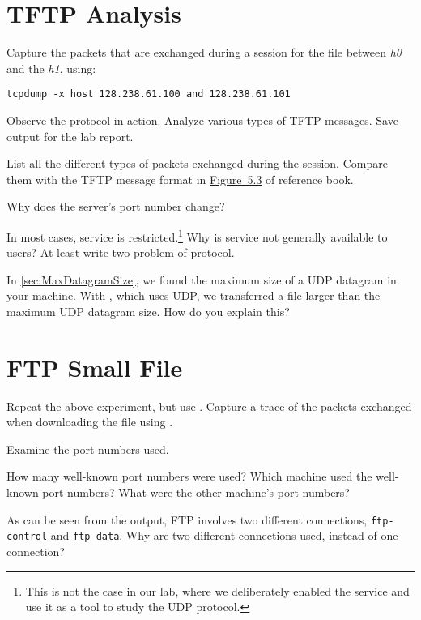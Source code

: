 \documentclass{../UTNetLab}
\begin{document}
\section{TFTP Analysis}
Capture the packets that are exchanged during a  session for the  file between \textit{h0} and the \textit{h1}, using:
\begin{lstlisting}[emph={h0,h1,netlab},morekeywords={[3]host,and}]
tcpdump -x host 128.238.61.100 and 128.238.61.101
    \end{lstlisting}
Observe the protocol in action.
Analyze various types of TFTP messages.
Save  output for the lab report.

\begin{report}
    \item List all the different types of packets exchanged during the  session.
    Compare them with the TFTP message format in \hyperref[fig:5.3]{Figure~5.3} of reference book.

    Why does the server’s port number change?

    \item In most cases,  service is restricted.\footnote{This is not the case in our lab, where we deliberately enabled the  service and use it as a tool to study the UDP protocol.}
    Why is  service not generally available to users? At least write two problem of  protocol.

    \item In \autoref{sec:MaxDatagramSize}, we found the maximum size of a UDP datagram in your machine.
    With , which uses UDP, we transferred a file larger than the maximum UDP datagram size.
    How do you explain this?
\end{report}

\section{FTP Small File}
Repeat the above experiment, but use .
Capture a trace of the packets exchanged when downloading the  file using .

Examine the port numbers used.

\begin{report}
    \item How many well-known port numbers were used?
    Which machine used the well-known port numbers?
    What were the other machine’s port numbers?

    \item As can be seen from the  output, FTP involves two different connections, \texttt{ftp-control} and \texttt{ftp-data}.
    Why are two different connections used, instead of one connection?
\end{report}
\end{document}

